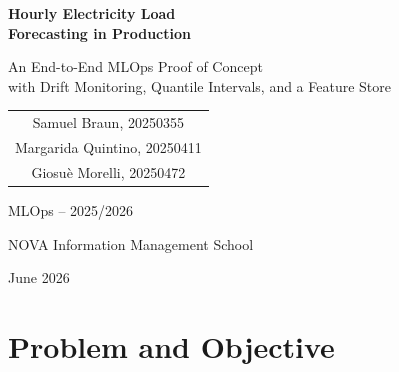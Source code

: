 \documentclass[11pt,a4paper]{article}
\begin{document}
\begin{titlepage}
    \centering
    \vspace*{3cm}

    {\Huge\bfseries Hourly Electricity Load\\[8pt] Forecasting in Production\par}

    \vspace{1.2cm}

    {\Large An End-to-End MLOps Proof of Concept\\[4pt]
    with Drift Monitoring, Quantile Intervals, and a Feature Store\par}

    \vspace{2.5cm}

    {\large
    \begin{tabular}{c}
        Samuel Braun, 20250355\\
        Margarida Quintino, 20250411\\
        Giosu\`e Morelli, 20250472\\
    \end{tabular}
    \par}

    \vspace{1.6cm}

    {\large MLOps -- 2025/2026\par}

    \vfill

    {\large NOVA Information Management School\par}
    {\large June 2026\par}
\end{titlepage}

\clearpage
{}
\setcounter{page}{1}
{\renewcommand{\baselinestretch}{1.0}\normalsize
\tableofcontents}
\clearpage
{}
\setcounter{page}{1}

\section{Problem and Objective}
\end{document}
